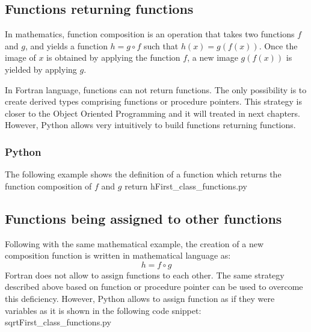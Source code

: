 \newpage 
\subsection{Functions returning functions} 
In mathematics, 
function composition is an operation 
that takes two functions $f$ and $g$, and yields a function $ h = g  \circ  f  $ 
such that $ h(x) = g(f(x))$. 
Once the image of $ x $ is obtained by applying the function $ f $, 
a new image  $g(f(x))$ is yielded by applying $ g $. 

In Fortran language, functions can not return functions. 
The only possibility is to create derived types comprising 
functions or procedure pointers. This strategy is closer to the
Object Oriented Programming and it will treated in next chapters. 
However, Python allows very intuitively to build functions returning functions. 

\subsubsection*{Python}
The following example shows the definition of a function which returns 
the function composition of $ f $ and $ g $
\lstpython 
\vspace{0.5cm}
  {return h}{First_class_functions.py}
  
\subsection{Functions being assigned to other functions} 
Following with the same mathematical example, 
the creation of a new composition function is written in mathematical 
language as:
\begin{equation}
     h = f \circ g  
\end{equation} 
Fortran does not allow to assign functions to each other. 
The same strategy described above based on function or procedure pointer can be used to 
overcome this deficiency. However, Python allows to assign function
 as if they were variables as it is shown in the following code snippet: 
\lstpython 
\vspace{0.4cm}
  {sqrt}{First_class_functions.py}




\newpage   
